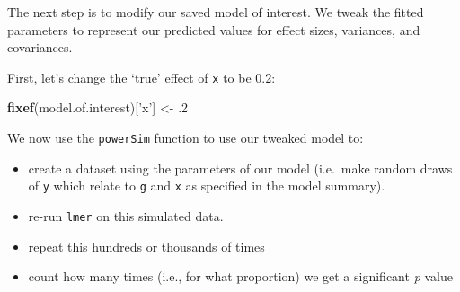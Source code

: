 \documentclass[]{article}
\newenvironment{Shaded}{\begin{snugshade}}{\end{snugshade}}
\newcommand{\KeywordTok}[1]{\textcolor[rgb]{0.13,0.29,0.53}{\textbf{#1}}}
\newcommand{\DecValTok}[1]{\textcolor[rgb]{0.00,0.00,0.81}{#1}}
\newcommand{\StringTok}[1]{\textcolor[rgb]{0.31,0.60,0.02}{#1}}
\newcommand{\NormalTok}[1]{#1}
\providecommand{\tightlist}{%
  \setlength{\itemsep}{0pt}\setlength{\parskip}{0pt}}
\theoremstyle{definition}
\theoremstyle{definition}
\theoremstyle{definition}
\theoremstyle{remark}
\begin{document}
The next step is to modify our saved model of interest. We tweak the
fitted parameters to represent our predicted values for effect sizes,
variances, and covariances.

First, let's change the `true' effect of \texttt{x} to be 0.2:

\begin{Shaded}
\begin{Highlighting}[]
\KeywordTok{fixef}\NormalTok{(model.of.interest)[}\StringTok{'x'}\NormalTok{] <-}\StringTok{ }\NormalTok{.}\DecValTok{2}
\end{Highlighting}
\end{Shaded}

We now use the \texttt{powerSim} function to use our tweaked model to:

\begin{itemize}
\tightlist
\item
  create a dataset using the parameters of our model (i.e.~make random
  draws of \texttt{y} which relate to \texttt{g} and \texttt{x} as
  specified in the model summary).
\item
  re-run \texttt{lmer} on this simulated data.
\item
  repeat this hundreds or thousands of times
\item
  count how many times (i.e., for what proportion) we get a significant
  \emph{p} value
\end{itemize}
\end{document}
